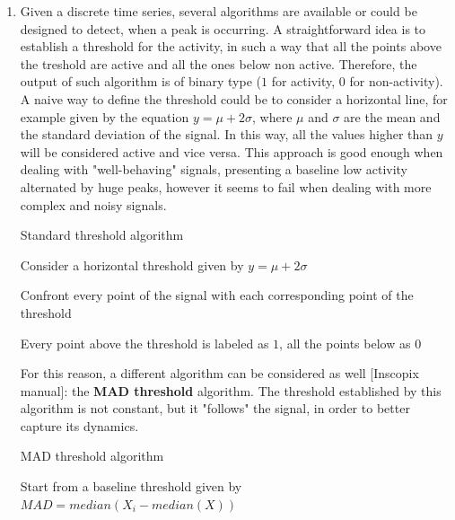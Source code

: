 \documentclass[a4paper]{article}
\begin{document}
\begin{enumerate}
	
	\item  Given a discrete time series, several algorithms are available or could be designed to detect, when a peak is occurring. A straightforward idea is to establish a threshold for the activity, in such a way that all the points above the treshold are active and all the ones below non active. Therefore, the output of such algorithm is of binary type ($1$ for activity, $0$ for non-activity).\\
	
	A naive way to define the threshold could be to consider a horizontal line, for example given by the equation $ y = \mu + 2\sigma $,	where $\mu$ and $\sigma$ are the mean and the standard deviation of the signal. In this way, all the values higher than $y$ will be considered active and vice versa. This approach is good enough when dealing with "well-behaving" signals, presenting a baseline low activity alternated by huge peaks, however it seems to fail when dealing with more complex and noisy signals.\\
	\begin{algorithm}
		\caption{Standard threshold algorithm}\label{tresh}
		\begin{algorithmic}[1]
			
			
			\State Consider a horizontal threshold given by $ y = \mu + 2\sigma $
			
			\State Confront every point of the signal with each corresponding point of the threshold
			
			\State Every point above the threshold is labeled as $1$, all the points below as $0$
		\end{algorithmic}
	\end{algorithm}
	
	
	For this reason, a different algorithm can be considered as well [Inscopix manual]: the \textbf{MAD threshold} algorithm. The threshold established by this algorithm is not constant, but it "follows" the signal, in order to better capture its dynamics. 
	
	
	
	
	
	
	
	\begin{algorithm}
		\caption{MAD threshold algorithm}\label{mad}
		\begin{algorithmic}[1]
			
			
			\State Start from a baseline threshold given by $ MAD = median(X_i - median(X))$
			

\end{algorithmic}
\end{algorithm}
\end{enumerate}
\end{document}
